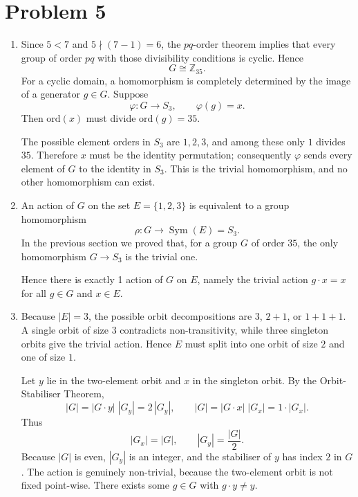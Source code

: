 \documentclass[12pt]{article}
\begin{document}
\section*{Problem 5}
\begin{enumerate}[label=(\arabic*)] 

\item
Since \(5<7\) and \(5\nmid(7-1)=6\), the $pq$-order theorem implies that every group of order \(pq\) with those divisibility conditions is cyclic.  Hence
\[
G \cong \mathbb Z_{35}.
\]
For a cyclic domain, a homomorphism is completely determined by the image of a generator \(g\in G\).  Suppose
\[
\varphi : G \longrightarrow S_{3},\qquad \varphi(g)=x.
\]
Then \(\mathrm{ord}(x)\) must divide \(\mathrm{ord}(g)=35\).

The possible element orders in \(S_{3}\) are \(1,2,3\), and among these only \(1\) divides \(35\).  Therefore \(x\) must be the identity permutation; consequently \(\varphi\) sends every element of \(G\) to the identity in \(S_{3}\).  This is the trivial homomorphism, and no other homomorphism can exist.

\item

An action of \(G\) on the set \(E=\{1,2,3\}\) is equivalent to a group homomorphism
\[
\rho : G \longrightarrow \operatorname{Sym}(E)=S_{3}.
\]
In the previous section we proved that, for a group \(G\) of order \(35\), the only homomorphism \(G\to S_{3}\) is the trivial one.  

Hence there is exactly 1 action of \(G\) on \(E\), namely the trivial action \(g\cdot x = x\) for all \(g\in G\) and \(x\in E\).

\item
Because \(|E| = 3\), the possible orbit decompositions are
\(3\), \(2+1\), or \(1+1+1\).
A single orbit of size \(3\) contradicts non-transitivity, while
three singleton orbits give the trivial action.
Hence \(E\) must split into one orbit of size \(2\) and one of size \(1\).

Let \(y\) lie in the two-element orbit and \(x\) in the singleton orbit.
By the Orbit-Stabiliser Theorem,
\[
|G| = |G\!\cdot\!y|\;|G_{y}| = 2\,|G_{y}|,\qquad
|G| = |G\!\cdot\!x|\;|G_{x}| = 1\cdot |G_{x}|.
\]
Thus
\[
|G_{x}| = |G|,\qquad |G_{y}| = \frac{|G|}{2}.
\]
Because \(|G|\) is even, \(|G_{y}|\) is an integer, and
the stabiliser of \(y\) has index \(2\) in \(G\).
The action is genuinely non-trivial, because the two-element orbit is not fixed point-wise. There exists some \(g\in G\) with \(g\!\cdot\!y \neq y\).


\end{enumerate}
\end{document}
